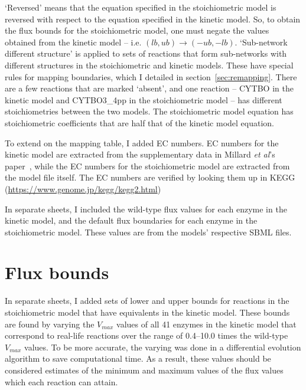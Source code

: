 \documentclass[parskip=full]{scrartcl}
\begin{document}
`Reversed' means that the equation specified in the stoichiometric model is reversed with respect to the equation specified in the kinetic model. So, to obtain the flux bounds for the stoichiometric model, one must negate the values obtained from the kinetic model -- i.e. $(lb, ub) \rightarrow (-ub, -lb)$. `Sub-network different structure' is applied to sets of reactions that form sub-networks with different structures in the stoichiometric and kinetic models. These have special rules for mapping boundaries, which I detailed in section~\vref{sec:remapping}. There are a few reactions that are marked `absent', and one reaction -- CYTBO in the kinetic model and CYTBO3\_4pp in the stoichiometric model -- has different stoichiometries between the two models. The stoichiometric model equation has stoichiometric coefficients that are half that of the kinetic model equation.

To extend on the mapping table, I added EC numbers. EC numbers for the kinetic model are extracted from the supplementary data in Millard \emph{et al}'s paper~\cite{millard_metabolic_2017}, while the EC numbers for the stoichiometric model are extracted from the model file itself. The EC numbers are verified by looking them up in KEGG (\url{https://www.genome.jp/kegg/kegg2.html})

In separate sheets, I included the wild-type flux values for each enzyme in the kinetic model, and the default flux boundaries for each enzyme in the stoichiometric model. These values are from the models' respective SBML files.

\section{Flux bounds}
\label{sec:fluxbounds}

In separate sheets, I added sets of lower and upper bounds for reactions in the stoichiometric model that have equivalents in the kinetic model. These bounds are found by varying the $V_{max}$ values of all 41 enzymes in the kinetic model that correspond to real-life reactions over the range of 0.4--10.0 times the wild-type $V_{max}$ values. To be more accurate, the varying was done in a differential evolution algorithm to save computational time. As a result, these values should be considered estimates of the minimum and maximum values of the flux values which each reaction can attain.




\end{document}
